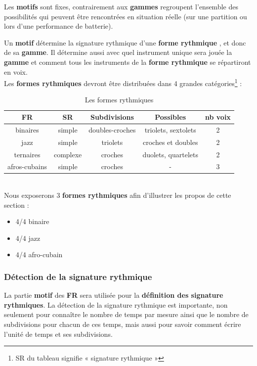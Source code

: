Les \textbf{motifs} sont fixes, contrairement aux \textbf{gammes} regroupent
l’ensemble des possibilités qui peuvent être rencontrées en situation réelle
(sur une partition ou lors d’une performance de batterie).

Un \textbf{motif} détermine la signature rythmique d’une
\textbf{forme rythmique} , et donc de sa \textbf{gamme}. Il détermine aussi
avec quel instrument unique sera jouée la \textbf{gamme} et comment tous les
instruments de la \textbf{forme rythmique} se répartiront en voix.\\




Les \textbf{formes rythmiques} devront être distribuées dans 4 grandes
catégories\footnote{SR du tableau signifie « signature rythmique »}
\cite{system_drums} :
\begin{table}[h]
\centering
\begin{tabular}{|c|c|c|c|c|} \hline
\textbf{FR} & SR & Subdivisions & Possibles & nb
voix \\ \hline
binaires & simple & doubles-croches & triolets, sextolets & 2 \\
jazz & simple & triolets & croches et doubles & 2 \\
ternaires & complexe & croches & duolets, quartelets & 2 \\
afros-cubains & simple & croches & - & 3 \\ \hline
\end{tabular}
\caption{Les formes rythmiques}
\end{table}\\
Nous exposerons 3 \textbf{formes rythmiques} afin d’illustrer les propos de
cette section :
\begin{itemize}
	\item 4/4 binaire 
	\item 4/4 jazz
	\item 4/4 afro-cubain
\end{itemize}

\subsubsection{Détection de la signature rythmique}
La partie \textbf{motif} des \textbf{FR} sera utilisée pour la
\textbf{définition des signature rythmiques}. 
La détection de la signature rythmique est importante, 
non seulement pour connaître le nombre de temps par mesure ainsi que le nombre
de subdivisions pour chacun de ces temps, mais aussi pour savoir comment écrire
l’unité de temps et ses subdivisions.

